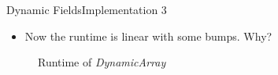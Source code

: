 
\begin{frame}{Dynamic Fields}{Implementation 3}
  \begin{itemize}
    \item
      Now the runtime is linear with some bumps. Why?
  \end{itemize}
  \begin{figure}
    
    \vspace{-1.0em}
    \caption{Runtime of \textit{DynamicArray}}
    \label{fig:runtime_dynamic_array_impl3}
  \end{figure}
\end{frame}


